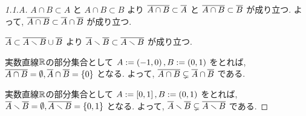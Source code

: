 \documentclass[uplatex, dvipdfmx, a4paper, 12pt, class=jsarticle, crop=false]{standalone}
\begin{document}
\begin{proof}[1.1.A]\label{eng-1-1-A-proof}
	\(A \cap B \subset A\)
	と
	\(A \cap B \subset B\)
	より
	\(\overline{A \cap B} \subset \overline{A}\)
	と
	\(\overline{A \cap B} \subset \overline{B}\)
	が成り立つ.
	よって, \(\overline{A \cap B}
	\subset \overline{A} \cap \overline{B}\)
	が成り立つ.

	\(\overline{A} \subset \overline{A \smallsetminus B}
	\cup \overline{B}\)
	より
	\(\overline{A} \smallsetminus \overline{B}
	\subset \overline{A \smallsetminus B}\)
	が成り立つ.

	実数直線\(\mathbb{R}\)の部分集合として
	\(A \mathrel{:=}\left( -1 , 0 \right),
	B \mathrel{:=} \left( 0 , 1 \right)\)
	をとれば,
	\(\topbar{A \cap B} = \emptyset,
	\topbar{A} \cap \topbar{B} =\lrbrace{0}\)
	となる.
	よって, \(\overline{A \cap B} \subsetneq
	\overline{A} \cap \overline{B}\)
	である.

	実数直線\(\mathbb{R}\)の部分集合として
	\(A \mathrel{:=}\left[ 0 , 1 \right],
	B \mathrel{:=} \left( 0 , 1 \right)\)
	をとれば,
	\(\topbar{A} \setminus
	\topbar{B} = \emptyset,
	\topbar{A \setminus B} =\lrbrace{0,1}\)
	となる.
	よって, \(\overline{A} \smallsetminus
	\overline{B}\subsetneq
	\overline{A \smallsetminus B}\)
	である.
\end{proof}
\end{document}
